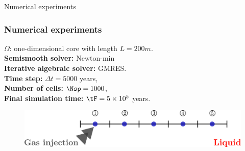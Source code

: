 \documentclass[aspectratio=169]{beamer}
\begin{document}
%
\begin{frame}
\centering
\Huge{\textcolor{carmine}{Numerical experiments}}
\end{frame}
% 
\begin{frame}
\frametitle{Numerical experiments}
$\Omega$:  one-dimensional core with length $L = 200 m$. 
\\
\vspace{0.2 cm}
\textbf{Semismooth solver:} Newton-min
\\
\vspace{0.2 cm}
\textbf{Iterative algebraic solver:} GMRES.
\\
\vspace{0.2 cm}
\textbf{Time step:} $\Delta t = 5000$ years, 
\\
\vspace{0.2 cm}
\textbf{Number of cells:} $\Nsp = 1000$, \\
\vspace{0.2 cm}
\textbf{Final simulation time:} $\tF = 5 \times 10^{5}$ years.
\\
\vspace{0.2 cm}
\begin{figure}
\includegraphics[width= 1 \textwidth]{fig_article_chap_3/num_exp_finite_vol}
\end{figure}

\end{frame}
% 
%
\end{document}
